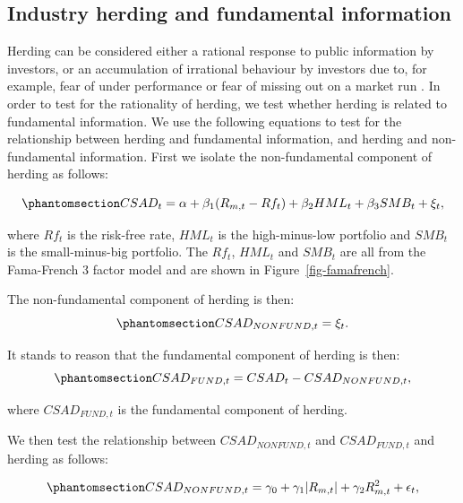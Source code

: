 \documentclass[
  letterpaper,
  DIV=11,
  numbers=noendperiod]{scrartcl}
\begin{document}
\subsection{Industry herding and fundamental
information}\label{industry-herding-and-fundamental-information}

Herding can be considered either a rational response to public
information by investors, or an accumulation of irrational behaviour by
investors due to, for example, fear of under performance or fear of
missing out on a market run \citep[see][]{Bikhchandani2001}. In order to
test for the rationality of herding, we test whether herding is related
to fundamental information. We use the following equations to test for
the relationship between herding and fundamental information, and
herding and non-fundamental information. First we isolate the
non-fundamental component of herding as follows:

\begin{equation}\phantomsection\label{eq-info}{CSAD_t = \alpha + \beta_1(R_{m,t} - Rf_t) + \beta_2HML_t + \beta_3SMB_t + \xi_t,}\end{equation}

where \(Rf_t\) is the risk-free rate, \(HML_t\) is the high-minus-low
portfolio and \(SMB_t\) is the small-minus-big portfolio. The \(Rf_t\),
\(HML_t\) and \(SMB_t\) are all from the Fama-French 3 factor model
\citep[see][]{fama1993common} and are shown in
Figure~\ref{fig-famafrench}.

The non-fundamental component of herding is then:
\begin{equation}\phantomsection\label{eq-nonfunda}{CSAD_{NONFUND, t} = \xi_t. }\end{equation}

It stands to reason that the fundamental component of herding is then:
\begin{equation}\phantomsection\label{eq-funda}{CSAD_{FUND, t} = CSAD_t - CSAD_{NONFUND, t},}\end{equation}

where \(CSAD_{FUND, t}\) is the fundamental component of herding.

We then test the relationship between \(CSAD_{NONFUND, t}\) and
\(CSAD_{FUND, t}\) and herding as follows:

\begin{equation}\phantomsection\label{eq-nonfundaherd}{CSAD_{NONFUND,t} = \gamma_0 +  \gamma_1|R_{m, t}| +  \gamma_2R_{m, t}^2 + \epsilon_{t},}\end{equation}
\end{document}
